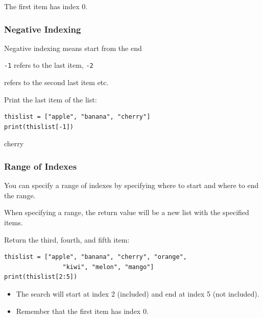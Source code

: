 \documentclass[12pt,a4paper]{article}
\newcommand{\code}[1]{%
	\colorbox{backcolour}{\lstinline{#1}}%
}
\begin{document}
\begin{nbox}
The first item has index 0.
\end{nbox}
\subsubsection{Negative Indexing}

Negative indexing means start from the end

\code{-1} refers to the last item, \code{-2}
refers to the second last item etc.

\begin{ebox}
Print the last item of the list:
	\begin{lstlisting}
thislist = ["apple", "banana", "cherry"]
print(thislist[-1])
	\end{lstlisting}
\tcblower
	\begin{vercode}
cherry
	\end{vercode}
\end{ebox}
\subsubsection{Range of Indexes}

You can specify a range of indexes by specifying where to
start and where to end the range.

When specifying a range, the return value will be a new list with
the specified items.

\begin{ebox}
Return the third, fourth, and fifth item:
	\begin{lstlisting}
thislist = ["apple", "banana", "cherry", "orange",
                "kiwi", "melon", "mango"]
print(thislist[2:5])
	\end{lstlisting}
\tcblower
	\begin{vercode}
	\end{vercode}
\end{ebox}

\begin{nbox}
	\begin{itemize}
	\item The search will start at index 2 (included)
		and end at index 5 (not included).
	\item Remember that the first item has index 0.
	\end{itemize}
\end{nbox}
\end{document}
